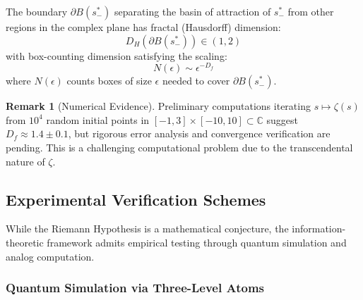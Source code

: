\documentclass[12pt]{article}
\theoremstyle{plain}
\theoremstyle{definition}
\newtheorem{remark}[theorem]{Remark}
\begin{document}
\begin{conjecture}\label{conj:fractal_dim}
The boundary $\partial B(s_-^*)$ separating the basin of attraction of $s_-^*$ from other regions in the complex plane has fractal (Hausdorff) dimension:
$$D_H(\partial B(s_-^*)) \in (1, 2)$$
with box-counting dimension satisfying the scaling:
$$N(\epsilon) \sim \epsilon^{-D_f}$$
where $N(\epsilon)$ counts boxes of size $\epsilon$ needed to cover $\partial B(s_-^*)$.
\end{conjecture}

\begin{remark}[Numerical Evidence]
Preliminary computations iterating $s \mapsto \zeta(s)$ from $10^4$ random initial points in $[-1, 3] \times [-10, 10] \subset \mathbb{C}$ suggest $D_f \approx 1.4 \pm 0.1$, but rigorous error analysis and convergence verification are pending. This is a challenging computational problem due to the transcendental nature of $\zeta$.
\end{remark}

\subsection{Experimental Verification Schemes}

While the Riemann Hypothesis is a mathematical conjecture, the information-theoretic framework admits empirical testing through quantum simulation and analog computation.

\subsubsection{Quantum Simulation via Three-Level Atoms}
\end{document}
